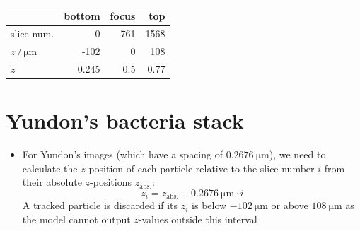 \documentclass[
  headings=standardclasses,
  a4paper,
  parskip=half,  %
  cleardoublepage=plain,  %
  DIV=18,
  fontsize=10pt
  ]{scrartcl}
\begin{document}
\begin{itemize}
\begin{table}[H]
            \centering
            \begingroup
            \setlength{\tabcolsep}{10pt} %
            \renewcommand{\arraystretch}{1.2} %
            \begin{tabular}{l | r r r}
                \toprule
                & bottom & focus & top \\
                \midrule
                slice num.     & 0 & 761   & 1568 \\
                $z \, /\,\unit{\um}$ & -102 & 0 & 108 \\
                $\tilde{z}$ & 0.245 & 0.5 &  0.77\\
                \bottomrule
            \end{tabular}
            \endgroup
        \end{table}


    \end{itemize}
        
    \section*{Yundon's bacteria stack}
    \begin{itemize}
    \item For Yundon's images (which have a spacing of $\qty{0.2676}{\um}$), we need to calculate the $z$-position of each particle relative to the slice number $i$ from their absolute $z$-positions $z_{\mathrm{abs.}}$:
        \begin{equation*}
            z_i = z_{\mathrm{abs.}} - \qty{0.2676}{\um} \cdot i
        \end{equation*}
        A tracked particle is discarded if its $z_i$ is below $-\qty{102}{\um}$ or above $\qty{108}{\um}$ as the model cannot output $z$-values outside this interval
    \end{itemize}
\end{document}
